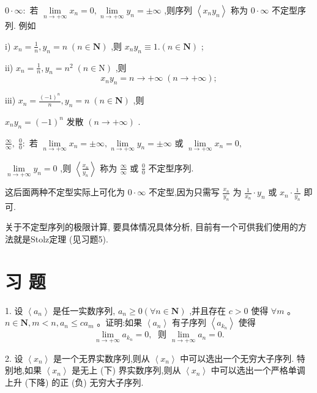 $0 \cdot  \infty  :$ 若 $\mathop{\lim }\limits_{{n \rightarrow   + \infty }}{x}_{n} = 0,\mathop{\lim }\limits_{{n \rightarrow   + \infty }}{y}_{n} =  \pm  \infty$ ,则序列 $\left\langle  {{x}_{n}{y}_{n}}\right\rangle$ 称为 $0 \cdot  \infty$ 不定型序列. 例如

i) ${x}_{n} = \frac{1}{n},{y}_{n} = n\;\left( {n \in  \mathbf{N}}\right)$ ,则 ${x}_{n}{y}_{n} \equiv  1.\left( {n \in  \mathbf{N}}\right)$ ;

ii) ${x}_{n} = \frac{1}{n},{y}_{n} = {n}^{2}\;\left( {n \in  \mathrm{N}}\right)$ ,则
$${x}_{n}{y}_{n} = n \rightarrow   + \infty \;\left( {n \rightarrow   + \infty }\right) ;$$

iii) ${x}_{n} = \frac{{\left( -1\right) }^{n}}{n},{y}_{n} = n\;\left( {n \in  \mathbf{N}}\right)$ ,则

${x}_{n}{y}_{n} = {\left( -1\right) }^{n}$ 发散 $\left( {n \rightarrow   + \infty }\right)$ .

$\frac{\infty }{\infty },\;\frac{0}{0} :$ 若 $\mathop{\lim }\limits_{{n \rightarrow   + \infty }}{x}_{n} =  \pm  \infty ,\mathop{\lim }\limits_{{n \rightarrow   + \infty }}{y}_{n} =  \pm  \infty$ 或 $\mathop{\lim }\limits_{{n \rightarrow   + \infty }}{x}_{n} = 0,$

$\mathop{\lim }\limits_{{n \rightarrow   + \infty }}{y}_{n} = 0$ ,则 $\left\langle  \frac{{x}_{n}}{{y}_{n}}\right\rangle$ 称为 $\frac{\infty }{\infty }$ 或 $\frac{0}{0}$ 不定型序列.

这后面两种不定型实际上可化为 $0 \cdot  \infty$ 不定型,因为只需写 $\frac{{x}_{n}}{{y}_{n}}$ 为 $\frac{1}{{x}_{n}} \cdot  {y}_{n}$ 或 ${x}_{n} \cdot  \frac{1}{{y}_{n}}$ 即可.

关于不定型序列的极限计算, 要具体情况具体分析, 目前有一个可供我们使用的方法就是Stolz定理 (见习题5).

\section*{习 题}

1. 设 $\left\langle  {a}_{n}\right\rangle$ 是任一实数序列, ${a}_{n} \geq  0\left( {\forall n \in  \mathbf{N}}\right)$ ,并且存在 $c > 0$ 使得 $\forall m$ 。 $n \in  \mathbf{N},m < n,{a}_{n} \leq  c{a}_{m}$ 。证明:如果 $\left\langle  {a}_{n}\right\rangle$ 有子序列 $\left\langle  {a}_{{k}_{n}}\right\rangle$ 使得
$$\mathop{\lim }\limits_{{n \rightarrow   + \infty }}{a}_{{k}_{n}} = 0,\;\text{ 则 }\mathop{\lim }\limits_{{n \rightarrow   + \infty }}{a}_{n} = 0.$$

2. 设 $\left\langle  {x}_{n}\right\rangle$ 是一个无界实数序列,则从 $\left\langle  {x}_{n}\right\rangle$ 中可以选出一个无穷大子序列. 特别地,如果 $\left\langle  {x}_{n}\right\rangle$ 是无上 (下) 界实数序列,则从 $\left\langle  {x}_{n}\right\rangle$ 中可以选出一个严格单调上升 (下降) 的正 (负) 无穷大子序列.

